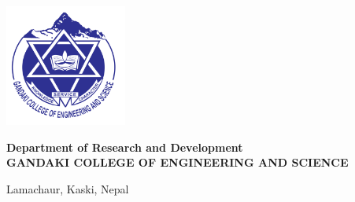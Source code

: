 \documentclass[a4paper, 14pt]{report}
\begin{document}
\begin{titlepage}
\begin{center}
			\vskip1cm
			
			\includegraphics[width=4cm]{gces.png}
			
			\vskip1cm
			
			\textbf{Department of Research and Development \\ GANDAKI COLLEGE OF ENGINEERING AND SCIENCE}
			
			Lamachaur, Kaski, Nepal

		\end{center}
	\end{titlepage}
	
\end{document}
